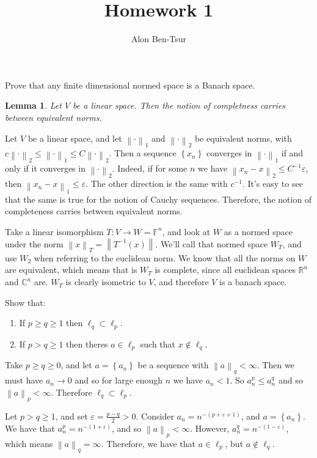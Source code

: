 \documentclass[11pt]{article} %
\title{Homework 1}
\author{Alon Ben-Tsur}
\newcommand{\norm}[1]{\left\lVert#1\right\rVert}
\newtheorem{lemma}{Lemma}
\begin{document}
\maketitle

\begin{Exercise}
Prove that any finite dimensional normed space is a Banach space.
\end{Exercise}

\begin{lemma}
Let $V$ be a linear space. Then the notion of completness carries between equivalent norms.
\end{lemma}
Let $V$ be a linear space, and let $\norm{ \cdot }_{1}$ and $\norm{ \cdot }_{2}$ be equivalent norms, with $c \norm{ \cdot }_{2} \leq \norm{ \cdot }_{1}  \leq C \norm{ \cdot }_{2}$. Then a sequence $\left\{x_n\right\}$ converges in $\norm{\cdot} _{1}$ if and only if it converges in $\norm{\cdot} _{2}$. Indeed, if for some $n$ we have $\norm{ x_n - x } _{2} \leq C^{-1}\varepsilon$, then $\norm{ x_n - x } _{1} \leq \varepsilon$. The other direction is the same with $c^{-1}$. It's easy to see that the same is true for the notion of Cauchy sequences. Therefore, the notion of completeness carries between equivalent norms.


\begin{Answer}
Take a linear isomorphism $T: V \to W = \mathbb{F}^n$, and look at $W$ as a normed space under the norm $\norm{x}_{T} = \norm{T^{-1}\left( x \right)}$. We'll call that normed space $W_T$, and use $W_2$ when referring to the euclidean norm. We know that all the norms on $W$ are equivalent, which means that is $W_T$ is complete, since all euclidean spaces $\mathbb{R}^{n}$ and $\mathbb{C}^{n}$ are. $W_T$ is clearly isometric to $V$, and therefore $V$ is a banach space.
\end{Answer}

\begin{Exercise}
Show that:
\begin{enumerate}
\item If $p \geq q \geq 1$ then $\ell_q \subset \ell_p$.
\item If $p > q \geq 1$ then theres $a \in \ell_p$ such that $x \notin \ell_q$.
\end{enumerate}
\end{Exercise}


\begin{Answer}
Take $p \geq q \geq 0$, and let $a = \left\{a_n\right\}$ be a sequence with $\norm{a}_q < \infty$. Then we must have $a_n \to 0$ and so for large enough $n$ we have $a_n < 1$. So $a_{n}^{p} \leq a_{n}^{q}$ and so $\norm{a}_p < \infty$. Therefore $\ell_q \subset \ell_p$.

Let $p > q \geq 1$, and set $\varepsilon = \frac{p - q}{2} > 0$. Consider $a_n = n^{-\left(p + \varepsilon + 1\right)}$, and $a=\left\{a_n\right\}$. We have that $a_{n}^{p} = n^{-\left(1+\varepsilon\right)}$, and so $\norm{a}_p < \infty$. However, $a_{n}^{q} = n^{-\left(1 - \varepsilon\right)}$, which means $\norm{a}_q = \infty$. Therefore, we have that $a \in \ell_p$, but $a \notin \ell_q$.
\end{Answer}
\end{document}
